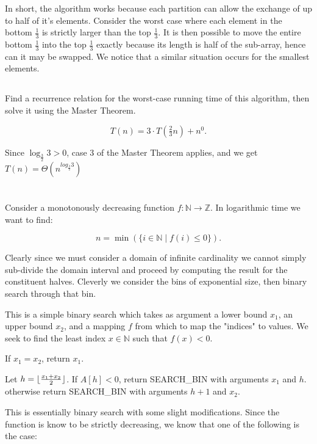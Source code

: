 \documentclass{amsart}
\theoremstyle{definition}
\theoremstyle{remark}
\numberwithin{equation}{section}
\newcommand{\NN}{\mathbb N}
\newcommand{\ZZ}{\mathbb Z}
\DeclarePairedDelimiter{\floor}{\lfloor}{\rfloor}
\begin{document}
In short, the algorithm works because each partition can allow the
exchange of up to half of it's elements. Consider the worst case where
each element in the bottom $\frac{1}{3}$ is strictly larger than the
top $\frac{1}{3}$. It is then possible to move the entire bottom
$\frac{1}{3}$ into the top $\frac{1}{3}$ exactly because its length
is half of the sub-array, hence can it may be swapped. We notice that
a similar situation occurs for the smallest elements.

\subsection{} Find a recurrence relation for the worst-case running time
of this algorithm, then solve it using the Master Theorem.

$$ T(n) = 3 \cdot T( \tfrac{2}{3} n) + n^0. $$

Since $\log_{\frac{3}{2}} {3} > 0$, case 3 of the Master Theorem applies, and we get
$T(n) = \Theta ( n^{log_{\frac{3}{2}} {3}} )$

\section{} 

Consider a monotonously decreasing function $f : \NN \rightarrow \ZZ$. In 
logarithmic time we want to find:

$$ n = \min (\{i \in \NN \mid f(i) \leq 0 \}).$$ 

Clearly since we must consider a domain of infinite cardinality we
cannot simply sub-divide the domain interval and proceed by computing
the result for the constituent halves. Cleverly we consider the bins of
exponential size, then binary search through that bin.


This is a simple binary search which takes as argument a lower bound
$x_1$, an upper bound $x_2$, and a mapping $f$ from which to map the
"indices" to values. We seek to find the least index $x \in \NN$ such
that $f(x) < 0$.

If $x_1 = x_2$, return $x_1$.

Let $h = \floor{\tfrac{x_1 + x_2}{2}}$. If $A[h] < 0$, return
SEARCH\_BIN with arguments $x_1$ and $h$. otherwise return 
SEARCH\_BIN with arguments $h+1$ and $x_2$.

\proof

This is essentially binary search with some slight modifications.
Since the function is know to be strictly decreasing, we know that
one of the following is the case:
\end{document}
